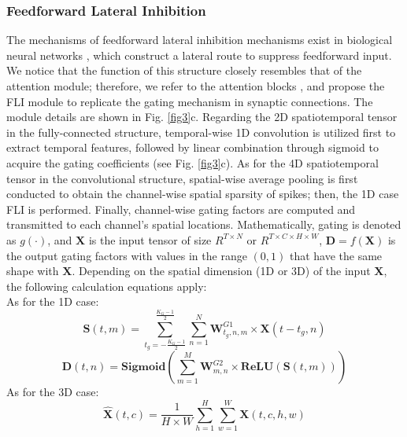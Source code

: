 \documentclass[letterpaper]{article} \usepackage[submission]{aaai23}  \usepackage{times}  \usepackage{helvet}  \usepackage{courier}  \usepackage[hyphens]{url}  \usepackage{graphicx} \urlstyle{rm} \def\UrlFont{\rm}  \usepackage{natbib}  \usepackage{caption} \frenchspacing  \setlength{\pdfpagewidth}{8.5in} \setlength{\pdfpageheight}{11in} \usepackage{algorithm}
\begin{document}
\subsubsection{Feedforward Lateral Inhibition}
The mechanisms of feedforward lateral inhibition mechanisms exist in biological neural networks \cite{luo_architectures_nodate}, which construct a lateral route to suppress feedforward input. We notice that the function of this structure closely resembles that of the attention module; therefore, we refer to the attention blocks \cite{hu_squeeze-and-excitation_2018,yao_temporal-wise_2021,zhu_tcja-snn_2022}, and propose the FLI module to replicate the gating mechanism in synaptic connections.
The module details are shown in Fig. \ref{fig3}c. 
Regarding the 2D spatiotemporal tensor in the fully-connected structure, temporal-wise 1D convolution is utilized first to extract temporal features, followed by linear combination through sigmoid to acquire the gating coefficients (see Fig. \ref{fig3}c).
As for the 4D spatiotemporal tensor in the convolutional structure, spatial-wise average pooling is first conducted to obtain the channel-wise spatial sparsity of spikes; then, the 1D case FLI is performed. Finally, channel-wise gating factors are computed and transmitted to each channel's spatial locations.
Mathematically, gating is denoted as $g(\cdot)$, and $\mathbf{X}$ is the input tensor of size $R^{T\times N}$ or $R^{T\times C\times H\times W}$, $\mathbf{D}=f(\mathbf{X})$ is the output gating factors with values in the range $(0,1)$ that have the same shape with $\mathbf{X}$. Depending on the spatial dimension (1D or 3D) of the input $\mathbf{X}$, the following calculation equations apply:\\
As for the 1D case:
\begin{equation}
\mathbf{S}\left( {t,m} \right) = {\sum\limits_{t_g = - \frac{K_G - 1}{2}}^{\frac{K_G - 1}{2}}{\sum\limits_{n=1}^{N}{\mathbf{W}^{G1}_{t_g,n,m} \times \mathbf{X}\left( {t - t_g,n} \right)}}}    
\end{equation}
\begin{equation}
\mathbf{D}\left( {t,n} \right) = \mathbf{Sigmoid}\left( {\sum\limits_{m = 1}^{M}{\mathbf{W}^{G2}_{m,n} \times \mathbf{ReLU}\left( {\mathbf{S}\left( {t,m} \right)} \right)}} \right)    
\end{equation}
As for the 3D case:
\begin{equation}
\hat{\mathbf{X}}\left( t,c \right) = \frac{1}{H \times W}{\sum\limits_{h = 1}^{H}{\sum\limits_{w = 1}^{W}{\mathbf{X}\left( t,c,h,w \right)}}}
\end{equation}
\end{document}
